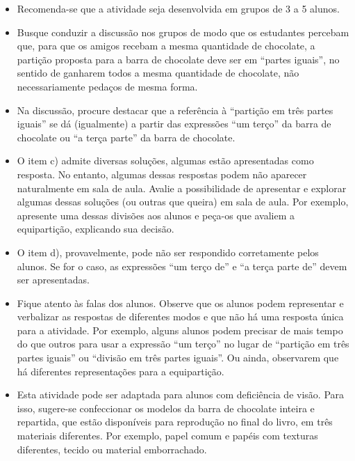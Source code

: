 \begin{multicols}{2}
  \begin{itemize} %
    \item       Recomenda-se que a atividade seja desenvolvida em grupos de 3 a 5 alunos.
    \item       Busque conduzir a discussão nos grupos de modo que os estudantes percebam que, para que os amigos recebam a mesma quantidade de chocolate, a partição proposta para a barra de chocolate deve ser em       ``partes iguais'', no sentido de ganharem todos a mesma quantidade de chocolate, não necessariamente pedaços de mesma forma.
    \item       Na discussão, procure destacar que a referência à       ``partição em três partes iguais'' se dá (igualmente) a partir das expressões       ``um terço'' da barra de chocolate ou       ``a terça parte'' da barra de chocolate.
    \item       O item c) admite diversas soluções, algumas estão apresentadas como resposta. No entanto, algumas dessas respostas podem não aparecer naturalmente em sala de aula. Avalie a possibilidade de apresentar e explorar algumas dessas soluções (ou outras que queira) em sala de aula. Por exemplo, apresente uma dessas divisões aos alunos e peça-os que avaliem a equipartição, explicando sua decisão.
    \item       O item d), provavelmente, pode não ser respondido corretamente pelos alunos. Se for o caso, as expressões ``um terço de'' e ``a terça parte de'' devem ser apresentadas.
    \item       Fique atento às falas dos alunos. Observe que os alunos podem representar e verbalizar as respostas de diferentes modos e que não há uma resposta única para a atividade. Por exemplo, alguns alunos podem precisar de mais tempo do que outros para usar a expressão       ``um terço'' no lugar de       ``partição em três partes iguais'' ou       ``divisão em três partes iguais''. Ou ainda, observarem que há diferentes representações para a equipartição.
\end{itemize} %


\begin{itemize} %
    \item       Esta atividade pode ser adaptada para alunos com deficiência de visão. Para isso, sugere-se confeccionar os modelos da barra de chocolate  inteira e repartida, que estão disponíveis para reprodução no final do livro, em três materiais diferentes. Por exemplo, papel comum e papéis com texturas diferentes, tecido ou material emborrachado.
\end{itemize} %


\end{multicols}
